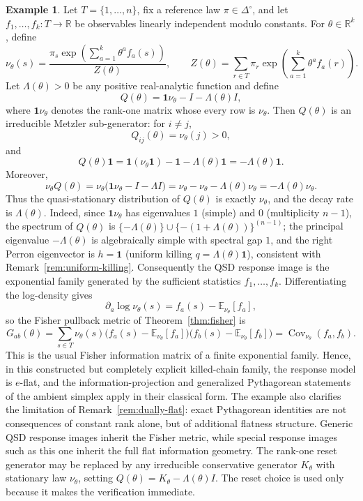 \documentclass[11pt,reqno]{amsart}
\theoremstyle{plain}
\theoremstyle{definition}
\newtheorem{example}[theorem]{Example}
\theoremstyle{remark}
\newcommand{\R}{\mathbb{R}}
\newcommand{\Simp}{\Delta^{\!\circ}}
\newcommand{\one}{\mathbf{1}}
\begin{document}
\begin{example}\label{ex:eflat}
Let $T=\{1,\ldots,n\}$, fix a reference law $\pi\in\Simp$, and let
$f_1,\ldots,f_k\colon T\to\R$ be observables linearly independent modulo constants.
For $\theta\in\R^k$, define
\[
\nu_\theta(s)
=
\frac{\pi_s\exp\!\left(\sum_{a=1}^k\theta^a f_a(s)\right)}{Z(\theta)},
\qquad
Z(\theta)
=
\sum_{r\in T}\pi_r\exp\!\left(\sum_{a=1}^k\theta^a f_a(r)\right).
\]
Let $\Lambda(\theta)>0$ be any positive real-analytic function and define
\[
Q(\theta)=\one\nu_\theta-I-\Lambda(\theta)I,
\]
where $\one\nu_\theta$ denotes the rank-one matrix whose every row is $\nu_\theta$.
Then $Q(\theta)$ is an irreducible Metzler sub-generator: for $i\ne j$,
\[
Q_{ij}(\theta)=\nu_\theta(j)>0,
\]
and
\[
Q(\theta)\one
=
\one(\nu_\theta\one)-\one-\Lambda(\theta)\one
=
-\Lambda(\theta)\one.
\]
Moreover,
\[
\nu_\theta Q(\theta)
=
\nu_\theta\bigl(\one\nu_\theta-I-\Lambda I\bigr)
=
\nu_\theta-\nu_\theta-\Lambda(\theta)\nu_\theta
=
-\Lambda(\theta)\nu_\theta.
\]
Thus the quasi-stationary distribution of $Q(\theta)$ is exactly $\nu_\theta$, and
the decay rate is $\Lambda(\theta)$. Indeed, since $\one\nu_\theta$ has eigenvalues
$1$ (simple) and $0$ (multiplicity $n-1$), the spectrum of $Q(\theta)$ is
$\{-\Lambda(\theta)\}\cup\{-(1+\Lambda(\theta))\}^{(n-1)}$; the principal eigenvalue
$-\Lambda(\theta)$ is algebraically simple with spectral gap $1$, and the right
Perron eigenvector is $h=\one$ (uniform killing $q=\Lambda(\theta)\one$), consistent
with Remark~\ref{rem:uniform-killing}.
Consequently the QSD response image is the exponential family generated by the
sufficient statistics $f_1,\ldots,f_k$. Differentiating the log-density gives
\[
\partial_a\log\nu_\theta(s)
=
f_a(s)-\mathbb E_{\nu_\theta}[f_a],
\]
so the Fisher pullback metric of Theorem~\ref{thm:fisher} is
\[
G_{ab}(\theta)
=
\sum_{s\in T}\nu_\theta(s)\bigl(f_a(s)-\mathbb E_{\nu_\theta}[f_a]\bigr)
\bigl(f_b(s)-\mathbb E_{\nu_\theta}[f_b]\bigr)
=
\operatorname{Cov}_{\nu_\theta}(f_a,f_b).
\]
This is the usual Fisher information matrix of a finite exponential family. Hence,
in this constructed but completely explicit killed-chain family, the response model
is $e$-flat, and the information-projection and generalized Pythagorean statements
of the ambient simplex apply in their classical form. The example also clarifies
the limitation of Remark~\ref{rem:dually-flat}: exact Pythagorean identities are not
consequences of constant rank alone, but of additional flatness structure. Generic
QSD response images inherit the Fisher metric, while special response images such
as this one inherit the full flat information geometry. The rank-one reset
generator may be replaced by any irreducible conservative generator $K_\theta$ with
stationary law $\nu_\theta$, setting $Q(\theta)=K_\theta-\Lambda(\theta)I$. The
reset choice is used only because it makes the verification immediate.
\end{example}
\end{document}
